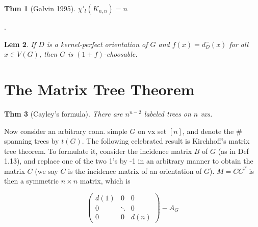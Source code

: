 \documentclass[11pt, fleqn, a4paper, landscape]{article}
\theoremstyle{plain} %
\newtheorem{thm}{Thm}
\newtheorem{lem}[thm]{Lem}
\theoremstyle{remark} %
\theoremstyle{definition} %
\newtheorem{defi}[thm]{Def}
\begin{document}
\begin{multicols}{5}
\addtocounter{thm}{2}
\begin{thm}[Galvin 1995]
$\chi'_l(K_{n,n}) = n$
\end{thm}.

\addtocounter{thm}{1}
\begin{lem}
If $D$ is a kernel-perfect orientation of $G$ and $f(x) = d^-_D(x)$ for all $x \in V (G)$, then $G$ is $(1 + f)$-choosable.
\end{lem}

\section{The Matrix Tree Theorem}

\begin{thm}[Cayley's formula]
There are $n^{n-2}$ labeled trees on $n$ vxs.
\end{thm}

Now consider an arbitrary conn. simple $G$ on vx set $[n]$, and denote the \# spanning trees by $t(G)$. The following celebrated result is Kirchhoff’s matrix tree theorem. To formulate it, consider the incidence matrix $B$ of $G$ (as in Def 1.13), and replace one of the
two 1’s by -1 in an arbitrary manner to obtain the matrix $C$ (we say $C$ is the incidence matrix of an orientation of $G$). $ M = CC^T$ is then a symmetric $n \times n$ matrix, which is 

\[
\begin{pmatrix}
d(1) & 0 & 0  \\
0 & \ddots & 0  \\
0 & 0 & d(n)  
\end{pmatrix}-A_G\]


\end{multicols}
\end{document}
